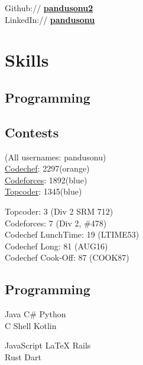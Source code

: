 \documentclass[a4paper]{deedy-resume} %
\begin{document}
\begin{minipage}[t]{0.33\textwidth}
Github:// \href{https://github.com/pandusonu2}{\bf pandusonu2} \\
LinkedIn:// \href{https://www.linkedin.com/in/pandusonu}{\bf pandusonu} \\

\sectionspace %

\section{Skills}

\sectionspace

\subsection{Programming}
\subsection{Contests}
(All usernames: pandusonu) \\
\href{https://www.codechef.com/users/pandusonu}{Codechef}: 2297(orange)\\
\href{http://codeforces.com/profile/pandusonu}{Codeforces}: 1892(blue) \\
\href{https://www.topcoder.com/members/pandusonu/}{Topcoder}: 1345(blue)\\

\sectionspace

Topcoder: 3 (Div 2 SRM 712)\\
Codeforces: 7 (Div 2, \#478)\\
Codechef LunchTime: 19 (LTIME53)\\
Codechef Long: 81 (AUG16)\\
Codechef Cook-Off: 87 (COOK87)

\sectionspace

\subsection{Programming}

Java \textbullet{} C\# \textbullet{} Python \textbullet{} \\
C \textbullet{} Shell \textbullet{} Kotlin

\sectionspace

JavaScript \textbullet{} \LaTeX \textbullet{} Rails \textbullet{} \\
 Rust \textbullet{} Dart




\end{minipage} %
\end{document}
